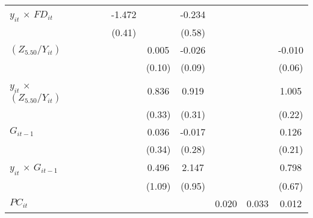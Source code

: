 \documentclass[12pt, a4paper]{article}
\begin{document}
\begin{table}
\begin{threeparttable}
{\begin{tabular}{l*{9}{c}}
				$y_{it}$ $\times$ $FD_{it}$ &                     &                     &                     &      -1.472\sym{***}&                     &      -0.234         &                     &                     &                     \\
				&                     &                     &                     &      (0.41)         &                     &      (0.58)         &                     &                     &                     \\
				$(Z_{5.50}/Y_{it})$          &                     &                     &                     &                     &       0.005         &      -0.026         &                     &                     &      -0.010         \\
				&                     &                     &                     &                     &      (0.10)         &      (0.09)         &                     &                     &      (0.06)         \\
				$y_{it}$ $\times$ $(Z_{5.50}/Y_{it})$&                     &                     &                     &                     &       0.836\sym{*}  &       0.919\sym{**} &                     &                     &       1.005\sym{***}\\
				&                     &                     &                     &                     &      (0.33)         &      (0.31)         &                     &                     &      (0.22)         \\
				$G_{it-1}$            &                     &                     &                     &                     &       0.036         &      -0.017         &                     &                     &       0.126         \\
				&                     &                     &                     &                     &      (0.34)         &      (0.28)         &                     &                     &      (0.21)         \\
				$y_{it}$ $\times$ $G_{it-1}$&                     &                     &                     &                     &       0.496         &       2.147\sym{*}  &                     &                     &       0.798         \\
				&                     &                     &                     &                     &      (1.09)         &      (0.95)         &                     &                     &      (0.67)         \\
				$PC_{it}$                &                     &                     &                     &                     &                     &                     &       0.020         &       0.033         &       0.012         \\

\end{tabular}}
\end{threeparttable}
\end{table}
\end{document}
